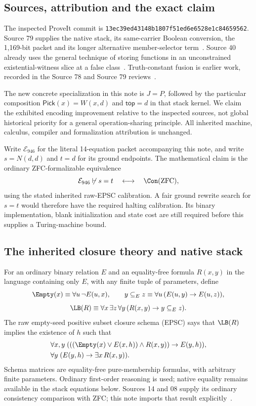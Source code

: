 \subsection{Sources, attribution and the exact claim}

The inspected ProveIt commit is
\texttt{13ec39ed43148b1807f51ed6e6528e1c84659562}.
Source 79 supplies the native stack, its same-carrier Boolean conversion,
the 1,169-bit packet and its longer alternative member-selector
term~\cite{stack79}. Source 40 already uses the general technique of
storing functions in an unconstrained existential-witness slice at a false
class~\cite{kernel40}. Truth-constant fusion is earlier work, recorded in
the Source 78 and Source 79 reviews~\cite{review79}.

The new concrete specialization in this note is $J=P$, followed by the
particular composition $\mathsf{Pick}(x)=W(x,d)$ and
$\mathsf{top}=d$ in that stack kernel. We claim the exhibited encoding
improvement relative to the inspected sources, not global historical
priority for a general operation-sharing principle. All inherited machine,
calculus, compiler and formalization attribution is unchanged.

Write $\mathcal E_{946}$ for the literal 14-equation packet accompanying
this note, and write $s=N(d,d)$ and $t=d$ for its ground endpoints. The
mathematical claim is the ordinary ZFC-formalizable equivalence
\[
 \mathcal E_{946}\not\vdash s=t\quad\longleftrightarrow\quad
 \Con(\mathrm{ZFC}),
\]
using the stated inherited raw-EPSC calibration. A fair ground rewrite
search for $s=t$ would therefore have the required halting calibration.
Its binary implementation, blank initialization and state cost are still
required before this supplies a Turing-machine bound.

\subsection{The inherited closure theory and native stack}

For an ordinary binary relation $E$ and an equality-free formula
$R(x,y)$ in the language containing only $E$, with any finite tuple of
parameters, define
\[
 \Empty(x)\equiv\forall u\,\neg E(u,x),\qquad
 y\subseteq_E z\equiv\forall u\,(E(u,y)\to E(u,z)),
\]
\[
 \LB(R)\equiv\forall x\,\exists z\,\forall y\,
               (R(x,y)\to y\subseteq_E z).
\]
The raw empty-seed positive subset closure schema (EPSC) says that
$\LB(R)$ implies the existence of $h$ such that
\begin{align}
 &\forall x,y\;(((\Empty(x)\lor E(x,h))\land R(x,y))\to E(y,h)),\label{epsc-close}\\
 &\forall y\;(E(y,h)\to\exists x\,R(x,y)).\label{epsc-support}
\end{align}
Schema matrices are equality-free pure-membership formulas, with arbitrary
finite parameters. Ordinary first-order reasoning is used; native equality
remains available in the stack equations below. Sources 14 and 08 supply
its ordinary consistency
comparison with ZFC; this note imports that result explicitly~\cite{epsc14}.


